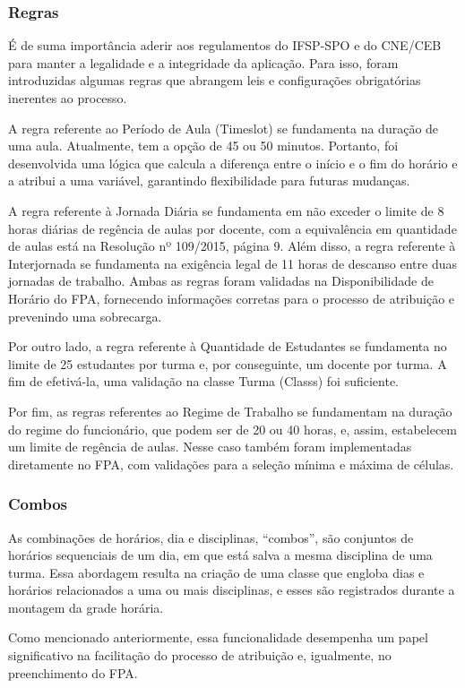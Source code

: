 \documentclass[12pt]{article}
\begin{document}
\subsubsection{Regras}
\par É de suma importância aderir aos regulamentos do IFSP-SPO e do CNE/CEB para manter a legalidade e a integridade da aplicação. Para isso, foram introduzidas algumas regras que abrangem leis e configurações obrigatórias inerentes ao processo. 
\par A regra referente ao Período de Aula (Timeslot) se fundamenta na duração de uma aula. Atualmente, tem a opção de 45 ou 50 minutos. Portanto, foi desenvolvida uma lógica que calcula a diferença entre o início e o fim do horário e a atribui a uma variável, garantindo flexibilidade para futuras mudanças. 
\par A regra referente à Jornada Diária se fundamenta em não exceder o limite de 8 horas diárias de regência de aulas por docente, com a equivalência em quantidade de aulas está na Resolução nº 109/2015, página 9. Além disso, a regra referente à Interjornada se fundamenta na exigência legal de 11 horas de descanso entre duas jornadas de trabalho. Ambas as regras foram validadas na Disponibilidade de Horário do FPA, fornecendo informações corretas para o processo de atribuição e prevenindo uma sobrecarga.
\par Por outro lado, a regra referente à Quantidade de Estudantes se fundamenta no limite de 25 estudantes por turma e, por conseguinte, um docente por turma. A fim de efetivá-la, uma validação na classe Turma (Classs) foi suficiente. 
\par Por fim, as regras referentes ao Regime de Trabalho se fundamentam na duração do regime do funcionário, que podem ser de 20 ou 40 horas, e, assim, estabelecem um limite de regência de aulas. Nesse caso também foram implementadas diretamente no FPA, com validações para a seleção mínima e máxima de células.
\subsubsection{Combos}
\par As combinações de horários, dia e disciplinas, “combos”, são conjuntos de horários sequenciais de um dia, em que está salva a mesma disciplina de uma turma. Essa abordagem resulta na criação de uma classe que engloba dias e horários relacionados a uma ou mais disciplinas, e esses são registrados durante a montagem da grade horária. 
\par Como mencionado anteriormente, essa funcionalidade desempenha um papel significativo na facilitação do processo de atribuição e, igualmente, no preenchimento do FPA.
\end{document}
